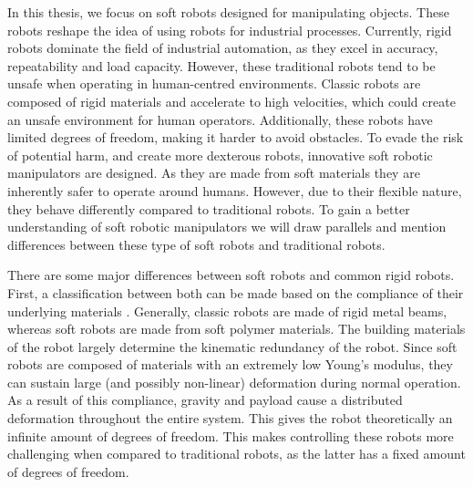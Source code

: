 In this thesis, we focus on soft robots designed for manipulating objects. These robots reshape the idea of using robots for industrial processes. Currently, rigid robots dominate the field of industrial automation, as they excel in accuracy, repeatability and load capacity. However, these traditional robots tend to be unsafe when operating in human-centred environments. Classic robots are composed of rigid materials and accelerate to high velocities, which could create an unsafe environment for human operators. Additionally, these robots have limited degrees of freedom, making it harder to avoid obstacles. To evade the risk of potential harm, and create more dexterous robots, innovative soft robotic manipulators are designed. As they are made from soft materials they are inherently safer to operate around humans. However, due to their flexible nature, they behave differently compared to traditional robots. To gain a better understanding of soft robotic manipulators we will draw parallels and mention differences between these type of soft robots and traditional robots. 


There are some major differences between soft robots and common rigid robots. First, a classification between both can be made based on the compliance of their underlying materials \cite{Bionics2008}. Generally, classic robots are made of rigid metal beams, whereas soft robots are made from soft polymer materials. The building materials of the robot largely determine the kinematic redundancy of the robot. Since soft robots are composed of materials with an extremely low Young's modulus, they can sustain large (and possibly non-linear) deformation during normal operation. As a result of this compliance, gravity and payload cause a distributed deformation throughout the entire system. This gives the robot theoretically an infinite amount of degrees of freedom. This makes controlling these robots more challenging when compared to traditional robots, as the latter has a fixed amount of degrees of freedom.

